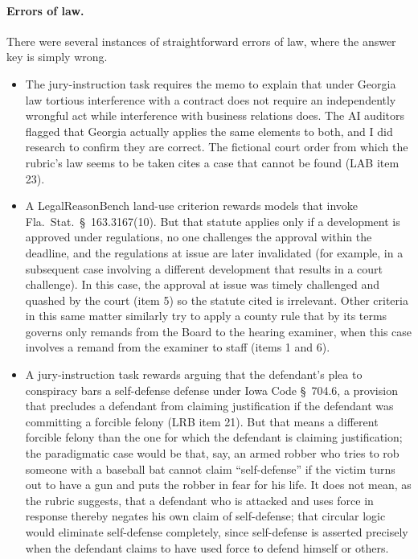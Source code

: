 \documentclass[11pt]{article}
\begin{document}
\paragraph{Errors of law.} There were several instances of straightforward errors of law, where the answer key is simply wrong.
\begin{itemize}
\item The jury-instruction task requires the memo to explain that under Georgia law tortious interference with a contract does not require an independently wrongful act while interference with business relations does. The AI auditors flagged that Georgia actually applies the same elements to both, and I did research to confirm they are correct. The fictional court order from which the rubric's law seems to be taken cites a case that cannot be found (LAB item 23).
\item A LegalReasonBench land-use criterion rewards models that invoke Fla.\ Stat.\ \S~163.3167(10). But that statute applies only if a development is approved under regulations, no one challenges the approval within the deadline, and the regulations at issue are later invalidated (for example, in a subsequent case involving a different development that results in a court challenge). In this case, the approval at issue was timely challenged and quashed by the court (item 5) so the statute cited is irrelevant. Other criteria in this same matter similarly try to apply a county rule that by its terms governs only remands from the Board to the hearing examiner, when this case involves a remand from the examiner to staff (items 1 and 6).
\item A jury-instruction task rewards arguing that the defendant's plea to conspiracy bars a self-defense defense under Iowa Code \S~704.6, a provision that precludes a defendant from claiming justification if the defendant was committing a forcible felony (LRB item 21). But that means a different forcible felony than the one for which the defendant is claiming justification; the paradigmatic case would be that, say, an armed robber who tries to rob someone with a baseball bat cannot claim ``self-defense'' if the victim turns out to have a gun and puts the robber in fear for his life. It does not mean, as the rubric suggests, that a defendant who is attacked and uses force in response thereby negates his own claim of self-defense; that circular logic would eliminate self-defense completely, since self-defense is asserted precisely when the defendant claims to have used force to defend himself or others.

\end{itemize}
\end{document}
